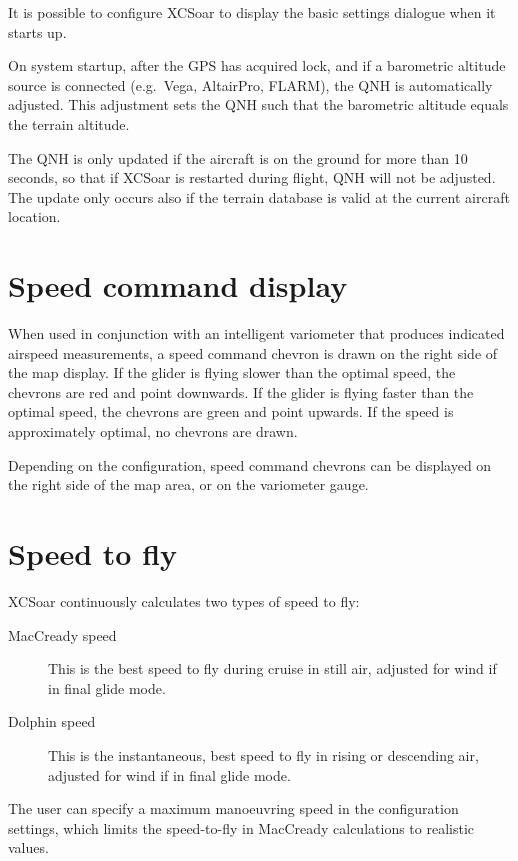\tip It is possible to configure XCSoar to display the basic
settings dialogue when it starts up.

On system startup, after the GPS has acquired lock, and if a
barometric altitude source is connected (e.g.\ Vega, AltairPro,
FLARM), the QNH is automatically adjusted.  This adjustment sets the
QNH such that the barometric altitude equals the terrain altitude.

The QNH is only updated if the aircraft is on the ground for more than
10 seconds, so that if XCSoar is restarted during flight, QNH will not
be adjusted.  The update only occurs also if the terrain database is
valid at the current aircraft location.

\section{Speed command display}

When used in conjunction with an intelligent variometer that produces
indicated airspeed measurements, a speed command chevron is drawn
on the right side of the map display.  If the glider is flying slower
than the optimal speed, the chevrons are red and point downwards.  If
the glider is flying faster than the optimal speed, the chevrons are
green and point upwards.  If the speed is approximately optimal, no
chevrons are drawn.


Depending on the configuration, speed command chevrons can be
displayed on the right side of the map area, or on the variometer
gauge.


\section{Speed to fly}\label{sec:stf}

XCSoar continuously calculates two types of speed to fly:
\begin{description}
\item[MacCready speed]  This is the best speed to fly during cruise
  in still air, adjusted for wind if in final glide mode.
\item[Dolphin speed]  This is the instantaneous, best speed to fly
  in rising or descending air, adjusted for wind if in final glide
  mode.
\end{description}  

The user can specify a maximum manoeuvring speed in the configuration
settings, which limits the speed-to-fly in MacCready calculations to
realistic values.

